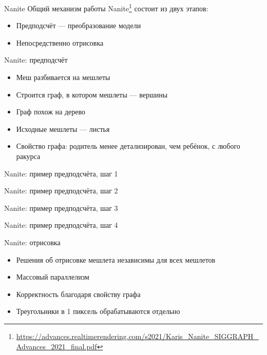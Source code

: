 \begin{frame}{Nanite}
    Общий механизм работы Nanite\footnote{\url{https://advances.realtimerendering.com/s2021/Karis_Nanite_SIGGRAPH_Advances_2021_final.pdf}} состоит из двух этапов:
    \begin{itemize}
        \item Предподсчёт --- преобразование модели
        \item Непосредственно отрисовка
    \end{itemize}
\end{frame}

\begin{frame}{Nanite: предподсчёт}
    \begin{itemize}
        \item Меш разбивается на мешлеты
        \item Строится граф, в котором мешлеты --- вершины
        \item Граф похож на дерево
        \item Исходные мешлеты --- листья
        \item \alert{Свойство графа: родитель менее детализирован, чем ребёнок, с любого ракурса}
    \end{itemize}
\end{frame}

\begin{frame}{Nanite: пример предподсчёта, шаг 1}
    \centering 
\end{frame}

\begin{frame}{Nanite: пример предподсчёта, шаг 2}
    \centering 
\end{frame}

\begin{frame}{Nanite: пример предподсчёта, шаг 3}
    \centering 
\end{frame}

\begin{frame}{Nanite: пример предподсчёта, шаг 4}
    \centering 
\end{frame}

\begin{frame}{Nanite: отрисовка}
    \begin{itemize}
        \item \alert{Решения об отрисовке мешлета независимы для всех мешлетов}
        \item Массовый параллелизм
        \item Корректность благодаря свойству графа
        \item Треугольники в 1 пиксель обрабатываются отдельно
    \end{itemize}
\end{frame}
